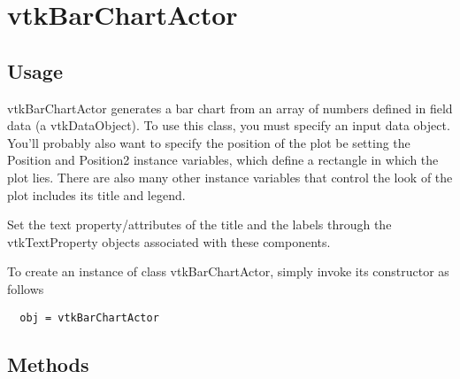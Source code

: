 \section{vtkBarChartActor}

\subsection{Usage}

 vtkBarChartActor generates a bar chart from an array of numbers defined in
 field data (a vtkDataObject). To use this class, you must specify an input
 data object. You'll probably also want to specify the position of the plot
 be setting the Position and Position2 instance variables, which define a
 rectangle in which the plot lies.  There are also many other instance
 variables that control the look of the plot includes its title and legend.

 Set the text property/attributes of the title and the labels through the 
 vtkTextProperty objects associated with these components.

To create an instance of class vtkBarChartActor, simply
invoke its constructor as follows
\begin{verbatim}
  obj = vtkBarChartActor
\end{verbatim}
\subsection{Methods}

